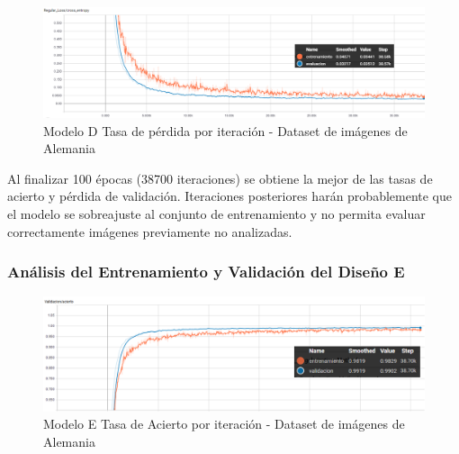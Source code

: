 			\begin{figure}[H]
				\begin{center}
				\includegraphics[width=1\textwidth]{images/desarrollo/trainResults/german/model6Loss} 
				\end{center}
				\begin{center}
				\caption{\small{Modelo D Tasa de pérdida por iteración - Dataset de imágenes de Alemania}}
				
				{\small{\fontsize{10}{16.8}\selectfont {Fuente: Elaboración propia}}}
				\end{center}
				\vspace{-1.5em}
			\end{figure}

			Al finalizar 100 épocas (38700 iteraciones) se obtiene la mejor de las  tasas de acierto y pérdida de validación. Iteraciones posteriores harán probablemente que el modelo se sobreajuste al conjunto de entrenamiento y no permita evaluar correctamente imágenes previamente no analizadas.
			

		\subsubsection{Análisis del Entrenamiento y Validación del Diseño E} 
			\begin{figure}[H]
				\begin{center}
				\includegraphics[width=1\textwidth]{images/desarrollo/trainResults/german/model7Acierto} 
				\end{center}
				\begin{center}
				\caption{\small{Modelo E Tasa de Acierto por iteración - Dataset de imágenes de Alemania  }}
				
				{\small{\fontsize{10}{16.8}\selectfont {Fuente: Elaboración propia}}}
				\end{center}
				\vspace{-1.5em}
			\end{figure}
		
